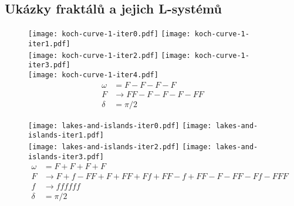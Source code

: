 \subsection{Ukázky fraktálů a jejich L-systémů}\label{subsec:ukazky-fraktalu-lsystemy}
\begin{figure}
    \centering
    \texttt{[image: koch-curve-1-iter0.pdf]}\qquad
    \texttt{[image: koch-curve-1-iter1.pdf]}\qquad\\
    \texttt{[image: koch-curve-1-iter2.pdf]}\qquad
    \texttt{[image: koch-curve-1-iter3.pdf]}\qquad\\
    \texttt{[image: koch-curve-1-iter4.pdf]}\qquad
    \begin{align*}
        \omega&=F-F-F-F\\
        F&\to FF-F-F-F-FF\\
        \delta&=\pi/2
    \end{align*}
\end{figure}
\begin{figure}
    \centering
    \texttt{[image: lakes-and-islands-iter0.pdf]}\qquad
    \texttt{[image: lakes-and-islands-iter1.pdf]}\qquad\\
    \texttt{[image: lakes-and-islands-iter2.pdf]}\qquad
    \texttt{[image: lakes-and-islands-iter3.pdf]}
    \begin{align*}
        \omega&=F+F+F+F\\
        F&\to F+f-FF+F+FF+Ff+FF-f+FF-F-FF-Ff-FFF\\
        f&\to ffffff\\
        \delta&=\pi/2
    \end{align*}
\end{figure}